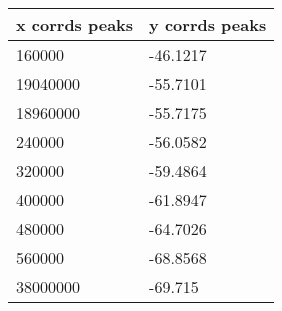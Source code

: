 \begin{tabular}{ll}
x corrds peaks & y corrds peaks \\ 
\hline 
160000 & -46.1217 \\ 
19040000 & -55.7101 \\ 
18960000 & -55.7175 \\ 
240000 & -56.0582 \\ 
320000 & -59.4864 \\ 
400000 & -61.8947 \\ 
480000 & -64.7026 \\ 
560000 & -68.8568 \\ 
38000000 & -69.715 \\ 
\hline 
\end{tabular}